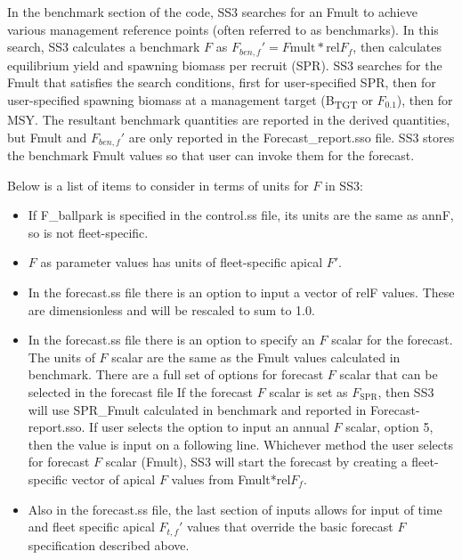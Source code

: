 In the benchmark section of the code, SS3 searches for an Fmult to achieve various management reference points (often referred to as benchmarks). In this search, SS3 calculates a benchmark $F$ as  $F_{ben,f}' = F\text{mult} * \text{rel}F_f$, then calculates equilibrium yield and spawning biomass per recruit (SPR). SS3 searches for the Fmult that satisfies the search conditions, first for user-specified SPR, then for user-specified spawning biomass at a management target (B\textsubscript{TGT} or $F_{0.1}$), then for MSY. The resultant benchmark quantities are reported in the derived quantities, but Fmult and $F_{ben,f}'$ are only reported in the Forecast\_report.sso file. SS3 stores the benchmark Fmult values so that user can invoke them for the forecast.

Below is a list of items to consider in terms of units for $F$ in SS3:
\begin{itemize}
	\item If F\_ballpark is specified in the control.ss file, its units are the same as annF, so is not fleet-specific.
	
	\item $F$ as parameter values has units of fleet-specific apical $F'$.
	
	\item In the forecast.ss file there is an option to input a vector of relF values. These are dimensionless and will be rescaled to sum to 1.0.
	
	\item In the forecast.ss file there is an option to specify an $F$ scalar for the forecast. The units of $F$ scalar are the same as the Fmult values calculated in benchmark. There are a full set of options for forecast $F$ scalar that can be selected in the forecast file 
	If the forecast $F$ scalar is set as $F_\text{SPR}$, then SS3 will use SPR\_Fmult calculated in benchmark and reported in Forecast-report.sso. If user selects the option to input an annual $F$ scalar, option 5, then the value is input on a following line. Whichever method the user selects for forecast $F$ scalar (Fmult), SS3 will start the forecast by creating a fleet-specific vector of apical $F$ values from Fmult*rel$F_f$.
	
	\item Also in the forecast.ss file, the last section of inputs allows for input of time and fleet specific apical $F_{t,f}'$ values that override the basic forecast $F$ specification described above.
\end{itemize}